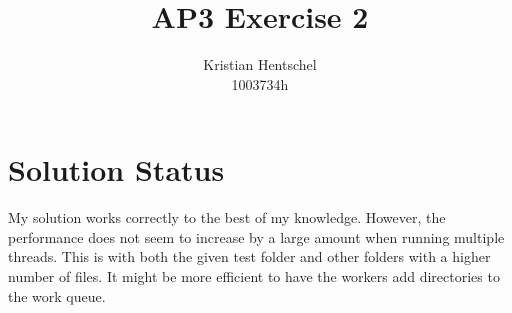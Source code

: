\documentclass{article}
\title{AP3 Exercise 2}
\author{Kristian Hentschel\\1003734h}
\begin{document}
\maketitle
\section{Solution Status}
My solution works correctly to the best of my knowledge. However, the performance does not seem to increase by a large amount when running multiple threads. This is with both the given test folder and other folders with a higher number of files. It might be more efficient to have the workers add directories to the work queue.
\end{document}
